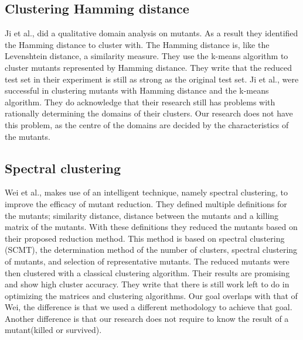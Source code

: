 \documentclass[../main]{subfiles}
\begin{document}
\subsection{Clustering Hamming distance}
Ji et al., did a qualitative domain analysis on mutants\cite{Ji2009}.
As a result they identified the Hamming distance to cluster with. 
The Hamming distance is, like the Levenshtein distance, a similarity measure.
They use the k-means algorithm to cluster mutants represented by Hamming distance.
They write that the reduced test set in their experiment is still as strong as the original test set\cite{Ji2009}.
\newline
Ji et al., were successful in clustering mutants with Hamming distance and the k-means algorithm.
They do acknowledge that their research still has problems with rationally determining the domains of their clusters.
Our research does not have this problem, as the centre of the domains are decided by the characteristics of the mutants.

\subsection{Spectral clustering}
Wei et al., makes use of an intelligent technique, namely spectral clustering, to improve the efficacy of mutant reduction\cite{Wei2021SpectralTesting}.
They defined multiple definitions for the mutants; similarity distance, distance between the mutants and a killing matrix of the mutants.
With these definitions they reduced the mutants based on their proposed reduction method.
This method is based on spectral clustering (SCMT), the determination method of the number of clusters, spectral clustering of mutants, and selection of representative mutants.
The reduced mutants were then clustered with a classical clustering algorithm.
Their results are promising and show high cluster accuracy.
They write that there is still work left to do in optimizing the matrices and clustering algorithms.
Our goal overlaps with that of Wei, the difference is that we used a different methodology to achieve that goal.
Another difference is that our research does not require to know the result of a mutant(killed or survived).
\end{document}
